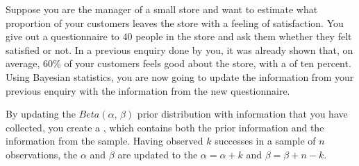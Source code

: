 \setcounter{chapter}{8}
\setcounter{section}{2}
\setcounter{question}{0}



Suppose you are the manager of a small store and want to estimate what proportion of your customers leaves the store with a feeling of satisfaction. You give out a questionnaire to 40 people in the store and ask them whether they felt satisfied or not. In a previous enquiry done by you, it was already shown that, on average, 60\% of your customers feels good about the store, with a  of ten percent. Using Bayesian statistics, you are now going to update the information from your previous enquiry with the information from the new questionnaire. \\



\onelineanswerbox


\emptyanswerbox{
    $\alpha$: \shortanswerline \hspace*{3cm} $\beta$: \shortanswerline
}


\rcodeanswertiny

By updating the $Beta(\alpha,\, \beta)$ prior distribution with information that you have collected, you create a , which contains both the prior information and the information from the sample. Having observed $k$ successes in a sample of $n$ observations, the  $\alpha$ and $\beta$ are updated to the  $\alpha = \alpha + k$ and $\beta = \beta + n - k$. \\

